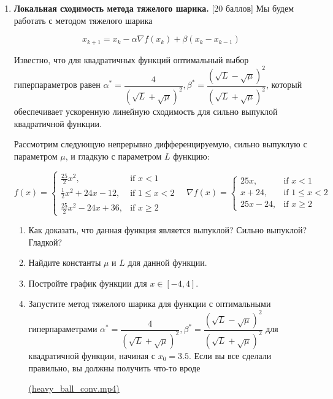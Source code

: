 \documentclass[
  russian,
  letterpaper,
  DIV=11,
  numbers=noendperiod]{scrartcl}
\begin{document}
\begin{enumerate}
\def\labelenumi{\arabic{enumi}.}
\item
  \textbf{Локальная сходимость метода тяжелого шарика.} {[}20 баллов{]}
  Мы будем работать с методом тяжелого шарика

  \[
   \tag{HB}
   x_{k+1} = x_k - \alpha \nabla f(x_k) + \beta (x_k - x_{k-1})
   \]

  Известно, что для квадратичных функций оптимальный выбор
  гиперпараметров равен
  \(\alpha^* = \dfrac{4}{(\sqrt{L} + \sqrt{\mu})^2}, \beta^* = \dfrac{(\sqrt{L} - \sqrt{\mu})^2}{(\sqrt{L} + \sqrt{\mu})^2}\),
  который обеспечивает ускоренную линейную сходимость для сильно
  выпуклой квадратичной функции.

  Рассмотрим следующую непрерывно дифференцируемую, сильно выпуклую с
  параметром \(\mu\), и гладкую с параметром \(L\) функцию:

  \[
   f(x) = 
   \begin{cases} 
   \frac{25}{2}x^2, & \text{if } x < 1 \\
   \frac12x^2 + 24x - 12, & \text{if } 1 \leq x < 2 \\
   \frac{25}{2}x^2 - 24x + 36, & \text{if } x \geq 2
   \end{cases}
   \quad
   \nabla f(x) = 
   \begin{cases} 
   25x, & \text{if } x < 1 \\
   x + 24, & \text{if } 1 \leq x < 2 \\
   25x - 24, & \text{if } x \geq 2
   \end{cases}
   \]

  \begin{enumerate}
  \def\labelenumii{\arabic{enumii}.}
  \item
    Как доказать, что данная функция является выпуклой? Сильно выпуклой?
    Гладкой?
  \item
    Найдите константы \(\mu\) и \(L\) для данной функции.
  \item
    Постройте график функции для \(x \in [-4, 4]\).
  \item
    Запустите метод тяжелого шарика для функции с оптимальными
    гиперпараметрами
    \(\alpha^* = \dfrac{4}{(\sqrt{L} + \sqrt{\mu})^2}, \beta^* = \dfrac{(\sqrt{L} - \sqrt{\mu})^2}{(\sqrt{L} + \sqrt{\mu})^2}\)
    для квадратичной функции, начиная с \(x_0 = 3.5\). Если вы все
    сделали правильно, вы должны получить что-то вроде

    \href{https://drive.google.com/file/d/1HN_Hu4DKYoSvUrtbLbjEm79LRsiUlK8r/view?usp=sharing}{(heavy\_ball\_conv.mp4)}


\end{enumerate}
\end{enumerate}
\end{document}
